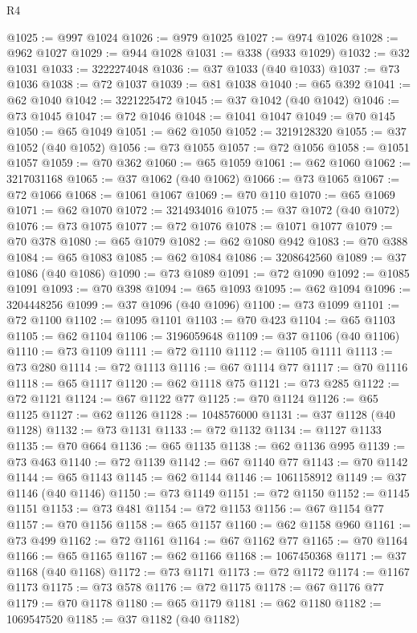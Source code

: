\begin{lexlean}{R4}
\begin{coremodule}
@1025 := @997 @1024
@1026 := @979 @1025
@1027 := @974 @1026
@1028 := @962 @1027
@1029 := @944 @1028
@1031 := @338 (@933 @1029)
@1032 := @32 @1031
@1033 := 3222274048
@1036 := @37 @1033 (@40 @1033)
@1037 := @73 @1036
@1038 := @72 @1037
@1039 := @81 @1038
@1040 := @65 @392
@1041 := @62 @1040
@1042 := 3221225472
@1045 := @37 @1042 (@40 @1042)
@1046 := @73 @1045
@1047 := @72 @1046
@1048 := @1041 @1047
@1049 := @70 @145
@1050 := @65 @1049
@1051 := @62 @1050
@1052 := 3219128320
@1055 := @37 @1052 (@40 @1052)
@1056 := @73 @1055
@1057 := @72 @1056
@1058 := @1051 @1057
@1059 := @70 @362
@1060 := @65 @1059
@1061 := @62 @1060
@1062 := 3217031168
@1065 := @37 @1062 (@40 @1062)
@1066 := @73 @1065
@1067 := @72 @1066
@1068 := @1061 @1067
@1069 := @70 @110
@1070 := @65 @1069
@1071 := @62 @1070
@1072 := 3214934016
@1075 := @37 @1072 (@40 @1072)
@1076 := @73 @1075
@1077 := @72 @1076
@1078 := @1071 @1077
@1079 := @70 @378
@1080 := @65 @1079
@1082 := @62 @1080 @942
@1083 := @70 @388
@1084 := @65 @1083
@1085 := @62 @1084
@1086 := 3208642560
@1089 := @37 @1086 (@40 @1086)
@1090 := @73 @1089
@1091 := @72 @1090
@1092 := @1085 @1091
@1093 := @70 @398
@1094 := @65 @1093
@1095 := @62 @1094
@1096 := 3204448256
@1099 := @37 @1096 (@40 @1096)
@1100 := @73 @1099
@1101 := @72 @1100
@1102 := @1095 @1101
@1103 := @70 @423
@1104 := @65 @1103
@1105 := @62 @1104
@1106 := 3196059648
@1109 := @37 @1106 (@40 @1106)
@1110 := @73 @1109
@1111 := @72 @1110
@1112 := @1105 @1111
@1113 := @73 @280
@1114 := @72 @1113
@1116 := @67 @1114 @77
@1117 := @70 @1116
@1118 := @65 @1117
@1120 := @62 @1118 @75
@1121 := @73 @285
@1122 := @72 @1121
@1124 := @67 @1122 @77
@1125 := @70 @1124
@1126 := @65 @1125
@1127 := @62 @1126
@1128 := 1048576000
@1131 := @37 @1128 (@40 @1128)
@1132 := @73 @1131
@1133 := @72 @1132
@1134 := @1127 @1133
@1135 := @70 @664
@1136 := @65 @1135
@1138 := @62 @1136 @995
@1139 := @73 @463
@1140 := @72 @1139
@1142 := @67 @1140 @77
@1143 := @70 @1142
@1144 := @65 @1143
@1145 := @62 @1144
@1146 := 1061158912
@1149 := @37 @1146 (@40 @1146)
@1150 := @73 @1149
@1151 := @72 @1150
@1152 := @1145 @1151
@1153 := @73 @481
@1154 := @72 @1153
@1156 := @67 @1154 @77
@1157 := @70 @1156
@1158 := @65 @1157
@1160 := @62 @1158 @960
@1161 := @73 @499
@1162 := @72 @1161
@1164 := @67 @1162 @77
@1165 := @70 @1164
@1166 := @65 @1165
@1167 := @62 @1166
@1168 := 1067450368
@1171 := @37 @1168 (@40 @1168)
@1172 := @73 @1171
@1173 := @72 @1172
@1174 := @1167 @1173
@1175 := @73 @578
@1176 := @72 @1175
@1178 := @67 @1176 @77
@1179 := @70 @1178
@1180 := @65 @1179
@1181 := @62 @1180
@1182 := 1069547520
@1185 := @37 @1182 (@40 @1182)

\end{coremodule}
\end{lexlean}
